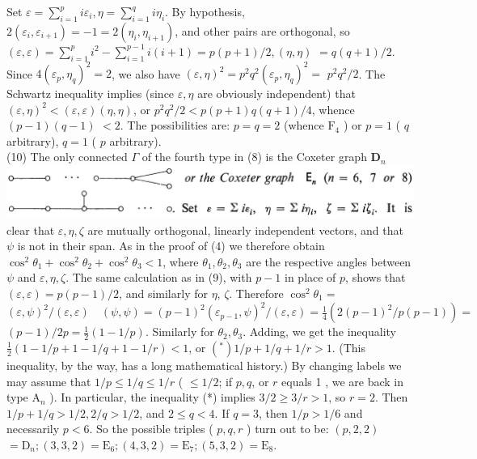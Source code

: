 \documentclass[10pt]{article}
\begin{document}
Set $\varepsilon=\sum_{i=1}^{p} i \varepsilon_{i}, \eta=\sum_{i=1}^{q} i \eta_{i}$. By hypothesis, $2\left(\varepsilon_{i}, \varepsilon_{i+1}\right)=-1=2\left(\eta_{i}, \eta_{i+1}\right)$, and other pairs are orthogonal, so $(\varepsilon, \varepsilon)=\sum_{i=1}^{p} i^{2}-\sum_{i=1}^{p-1} i(i+1)=p(p+1) / 2,(\eta, \eta)$ $=q(q+1) / 2$. Since $4\left(\varepsilon_{p}, \eta_{q}\right)^{2}=2$, we also have $(\varepsilon, \eta)^{2}=p^{2} q^{2}\left(\varepsilon_{p}, \eta_{q}\right)^{2}=$ $p^{2} q^{2} / 2$. The Schwartz inequality implies (since $\varepsilon, \eta$ are obviously independent) that $(\varepsilon, \eta)^{2}<(\varepsilon, \varepsilon)(\eta, \eta)$, or $p^{2} q^{2} / 2<p(p+1) q(q+1) / 4$, whence $(p-1)(q-1)$ $<2$. The possibilities are: $p=q=2$ (whence $\mathrm{F}_{4}$ ) or $p=1$ ( $q$ arbitrary), $q=1$ ( $p$ arbitrary).\\
(10) The only connected $\Gamma$ of the fourth type in (8) is the Coxeter graph $\mathbf{D}_{n}$\\
\includegraphics[max width=\textwidth, center]{2025_06_06_fac2836a92464059da43g-075(2)}\\
clear that $\varepsilon, \eta, \zeta$ are mutually orthogonal, linearly independent vectors, and that $\psi$ is not in their span. As in the proof of (4) we therefore obtain $\cos ^{2} \theta_{1}+\cos ^{2} \theta_{2}+\cos ^{2} \theta_{3}<1$, where $\theta_{1}, \theta_{2}, \theta_{3}$ are the respective angles between $\psi$ and $\varepsilon, \eta, \zeta$. The same calculation as in (9), with $p-1$ in place of $p$, shows that $(\varepsilon, \varepsilon)=p(p-1) / 2$, and similarly for $\eta$, $\zeta$. Therefore $\cos ^{2} \theta_{1}=$ $(\varepsilon, \psi)^{2} /(\varepsilon, \varepsilon) \quad(\psi, \psi)=(p-1)^{2}\left(\varepsilon_{p-1}, \psi\right)^{2} /(\varepsilon, \varepsilon)=\frac{1}{4}\left(2(p-1)^{2} / p(p-1)\right)=$ $(p-1) / 2 p=\frac{1}{2}(1-1 / p)$. Similarly for $\theta_{2}, \theta_{3}$. Adding, we get the inequality $\frac{1}{2}(1-1 / p+1-1 / q+1-1 / r)<1$, or $\left(^{*}\right) 1 / p+1 / q+1 / r>1$. (This inequality, by the way, has a long mathematical history.) By changing labels we may assume that $1 / p \leq 1 / q \leq 1 / r$ ( $\leq 1 / 2$; if $p, q$, or $r$ equals 1 , we are back in type $\mathrm{A}_{n}$ ). In particular, the inequality (*) implies $3 / 2 \geq 3 / r>1$, so $r=2$. Then $1 / p+1 / q>1 / 2,2 / q>1 / 2$, and $2 \leq q<4$. If $q=3$, then $1 / p>1 / 6$ and necessarily $p<6$. So the possible triples ( $p, q, r$ ) turn out to be: $(p, 2,2)$ $=\mathrm{D}_{n} ;(3,3,2)=\mathrm{E}_{6} ;(4,3,2)=\mathrm{E}_{7} ;(5,3,2)=\mathrm{E}_{8}$.
\end{document}
